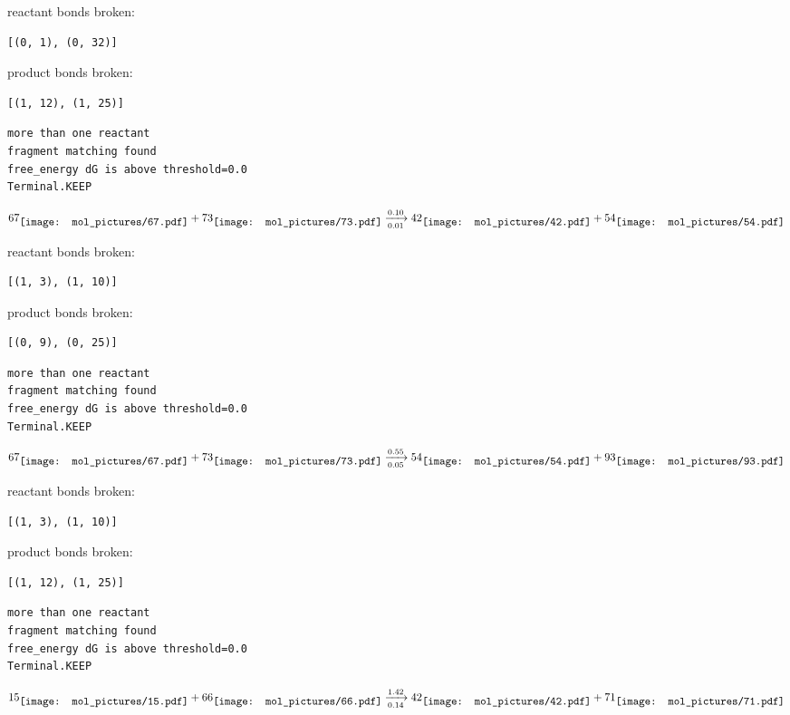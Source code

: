 \documentclass{article}
\begin{document}
reactant bonds broken:\begin{verbatim}
[(0, 1), (0, 32)]
\end{verbatim}
product bonds broken:\begin{verbatim}
[(1, 12), (1, 25)]
\end{verbatim}




\vspace{1cm}
\begin{verbatim}
more than one reactant
fragment matching found
free_energy dG is above threshold=0.0
Terminal.KEEP
\end{verbatim}
$$
67
\raisebox{-.5\height}{\texttt{[image: mol\_pictures/67.pdf]}}
+
73
\raisebox{-.5\height}{\texttt{[image: mol\_pictures/73.pdf]}}
\xrightarrow[0.01]{0.10}
42
\raisebox{-.5\height}{\texttt{[image: mol\_pictures/42.pdf]}}
+
54
\raisebox{-.5\height}{\texttt{[image: mol\_pictures/54.pdf]}}
$$


reactant bonds broken:\begin{verbatim}
[(1, 3), (1, 10)]
\end{verbatim}
product bonds broken:\begin{verbatim}
[(0, 9), (0, 25)]
\end{verbatim}




\vspace{1cm}
\begin{verbatim}
more than one reactant
fragment matching found
free_energy dG is above threshold=0.0
Terminal.KEEP
\end{verbatim}
$$
67
\raisebox{-.5\height}{\texttt{[image: mol\_pictures/67.pdf]}}
+
73
\raisebox{-.5\height}{\texttt{[image: mol\_pictures/73.pdf]}}
\xrightarrow[0.05]{0.55}
54
\raisebox{-.5\height}{\texttt{[image: mol\_pictures/54.pdf]}}
+
93
\raisebox{-.5\height}{\texttt{[image: mol\_pictures/93.pdf]}}
$$


reactant bonds broken:\begin{verbatim}
[(1, 3), (1, 10)]
\end{verbatim}
product bonds broken:\begin{verbatim}
[(1, 12), (1, 25)]
\end{verbatim}




\vspace{1cm}
\begin{verbatim}
more than one reactant
fragment matching found
free_energy dG is above threshold=0.0
Terminal.KEEP
\end{verbatim}
$$
15
\raisebox{-.5\height}{\texttt{[image: mol\_pictures/15.pdf]}}
+
66
\raisebox{-.5\height}{\texttt{[image: mol\_pictures/66.pdf]}}
\xrightarrow[0.14]{1.42}
42
\raisebox{-.5\height}{\texttt{[image: mol\_pictures/42.pdf]}}
+
71
\raisebox{-.5\height}{\texttt{[image: mol\_pictures/71.pdf]}}
$$
\end{document}
